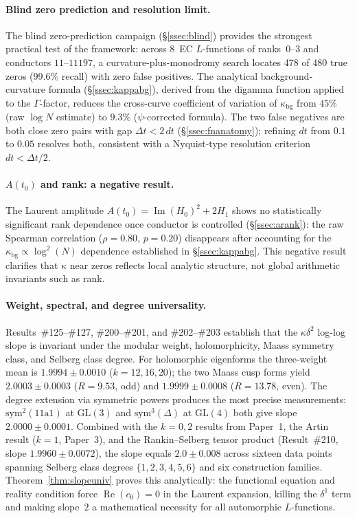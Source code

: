\documentclass[11pt, a4paper]{article}
\theoremstyle{plain}
\theoremstyle{definition}
\begin{document}
\paragraph{Blind zero prediction and resolution limit.}
The blind zero-prediction campaign (\S\ref{ssec:blind}) provides
the strongest practical test of the framework: across 8~EC
$L$-functions of ranks~0--3 and conductors $11$--$11197$, a
curvature-plus-monodromy search locates 478 of 480 true zeros
($99.6\%$ recall) with zero false positives.  The analytical
background-curvature formula (\S\ref{ssec:kappabg}), derived from
the digamma function applied to the $\Gamma$-factor, reduces the
cross-curve coefficient of variation of $\kappa_{\mathrm{bg}}$ from
$45\%$ (raw $\log N$ estimate) to $9.3\%$ ($\psi$-corrected formula).
The two false negatives are both close zero pairs with gap
$\Delta t < 2\,dt$ (\S\ref{ssec:fnanatomy}); refining $dt$ from
$0.1$ to $0.05$ resolves both, consistent with a Nyquist-type
resolution criterion $dt < \Delta t/2$.

\paragraph{$A(t_0)$ and rank: a negative result.}
The Laurent amplitude $A(t_0) = \operatorname{Im}(H_0)^2 + 2H_1$
shows no statistically significant rank dependence once conductor is
controlled (\S\ref{ssec:arank}): the raw Spearman correlation
($\rho=0.80$, $p=0.20$) disappears after accounting for the
$\kappa_{\mathrm{bg}} \propto \log^{2}(N)$ dependence established in
\S\ref{ssec:kappabg}.  This negative result clarifies that $\kappa$
near zeros reflects local analytic structure, not global arithmetic
invariants such as rank.

\paragraph{Weight, spectral, and degree universality.}
Results~\#125--\#127, \#200--\#201, and \#202--\#203 establish that the
$\kappa\delta^{2}$ log-log slope is invariant under the modular weight,
holomorphicity, Maass symmetry class, and Selberg class degree.
For holomorphic eigenforms the three-weight mean is $1.9994\pm 0.0010$
($k=12,16,20$); the two Maass cusp forms yield $2.0003\pm 0.0003$
($R=9.53$, odd) and $1.9999\pm 0.0008$ ($R=13.78$, even).  The degree
extension via symmetric powers produces the most precise measurements:
$\mathrm{sym}^{2}(\text{11a1})$ at $\mathrm{GL}(3)$ and
$\mathrm{sym}^{3}(\Delta)$ at $\mathrm{GL}(4)$ both give slope
$2.0000\pm 0.0001$.  Combined with the $k=0,2$ results from Paper~1,
the Artin result ($k=1$, Paper~3), and the Rankin--Selberg tensor product
(Result~\#210, slope $1.9960\pm 0.0072$), the slope equals
$2.0\pm 0.008$ across sixteen data points spanning Selberg class degrees
$\{1,2,3,4,5,6\}$ and six construction families.
Theorem~\ref{thm:slopeuniv} proves this analytically: the functional
equation and reality condition force $\operatorname{Re}(c_0)=0$ in the
Laurent expansion, killing the $\delta^1$ term and making slope~$2$ a
mathematical necessity for all automorphic $L$-functions.
\end{document}
